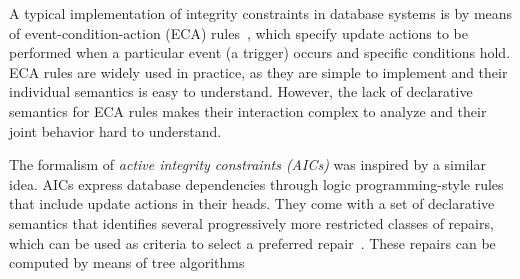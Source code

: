 \documentclass[runningheads]{llncs}
\begin{document}
A typical implementation of integrity constraints in database systems is by means of event-condition-action (ECA) rules~\cite{vldb/TenienteO95,mk/WidomC96}, which specify update actions to be performed when a particular event (a trigger) occurs and specific conditions hold.
ECA rules are widely used in practice, as they are simple to implement and their individual semantics is easy to understand.
However, the lack of declarative semantics for ECA rules makes their interaction complex to analyze and their joint behavior hard to understand.

The formalism of \emph{active integrity constraints (AICs)} \cite{ppdp/FlescaGZ04} was inspired by a similar idea.
AICs express database dependencies through logic programming-style rules that include update actions in their heads.
They come with a set of declarative semantics that identifies several progressively more restricted classes of repairs, which can be used as criteria to select a preferred repair~\cite{tplp/CaropreseT11}.
These repairs can be computed by means of tree algorithms
\end{document}
